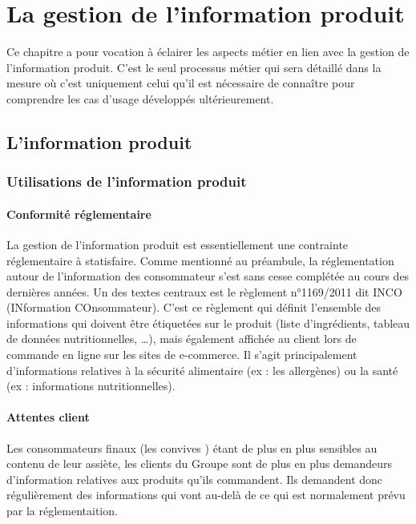     \chapter{La gestion de l'information produit}
    
    \large
    Ce chapitre a pour vocation à éclairer les aspects métier en lien avec la gestion de l'information produit. 
    C'est le seul processus métier qui sera détaillé dans la mesure où c'est uniquement celui qu'il est nécessaire de connaître pour comprendre les cas d'usage développés ultérieurement.
    \normalsize

        \section{L'information produit}
        
            \subsection{Utilisations de l'information produit}
            \label{utilisation_info_produit}

                \subsubsection{Conformité réglementaire}
                La gestion de l'information produit est essentiellement une contrainte réglementaire à statisfaire.
                Comme mentionné au préambule, la réglementation autour de l'information des consommateur s'est sans cesse complétée au cours des dernières années.
                Un des textes centraux est le règlement n°1169/2011 dit INCO (INformation COnsommateur)\cite{incotext}\cite{incoexpl}.
                C'est ce règlement qui définit l'ensemble des informations qui doivent être étiquetées sur le produit (liste d'ingrédients, tableau de données nutritionnelles, \dots), mais également affichée au client lors de commande en ligne sur les sites de e-commerce.
                Il s'agit principalement d'informations relatives à la sécurité alimentaire (ex : les allergènes) ou la santé (ex : informations nutritionnelles).

                \subsubsection{Attentes client}

                Les consommateurs finaux (les \og convives \fg) étant de plus en plus sensibles au contenu de leur assiète, les clients du Groupe sont de plus en plus demandeurs d'information relatives aux produits qu'ils commandent.
                Ils demandent donc régulièrement des informations qui vont au-delà de ce qui est normalement prévu par la réglementaition.

